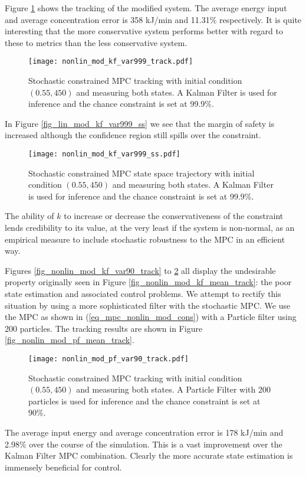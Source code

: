 Figure \ref{fig_nonlin_mod_kf_var999_track} shows the tracking of the modified system. The average energy input and average concentration error is 358 kJ/min and 11.31\% respectively. It is quite interesting that the more conservative system performs better with regard to these to metrics than the less conservative system.
\begin{figure}[H] 
\centering
\texttt{[image: nonlin\_mod\_kf\_var999\_track.pdf]}
\caption{Stochastic constrained MPC tracking with initial condition $(0.55, 450)$ and measuring both states. A Kalman Filter is used for inference and the chance constraint is set at 99.9\%.}
\label{fig_nonlin_mod_kf_var999_track}
\end{figure}
In Figure \ref{fig_lin_mod_kf_var999_ss} we see that the margin of safety is increased although the confidence region still spills over the constraint.
\begin{figure}[H] 
\centering
\texttt{[image: nonlin\_mod\_kf\_var999\_ss.pdf]}
\caption{Stochastic constrained MPC state space trajectory with initial condition $(0.55, 450)$ and measuring both states. A Kalman Filter is used for inference and the chance constraint is set at 99.9\%.}
\label{fig_nonlin_mod_kf_var999_ss}
\end{figure}
The ability of $k$ to increase or decrease the conservativeness of the constraint lends credibility to its value, at the very least if the system is non-normal, as an empirical measure to include stochastic robustness to the MPC in an efficient way.

Figures \ref{fig_nonlin_mod_kf_var90_track} to \ref{fig_nonlin_mod_kf_var999_ss} all display the undesirable property originally seen in Figure \ref{fig_nonlin_mod_kf_mean_track}: the poor state estimation and associated control problems. We attempt to rectify this situation by using a more sophisticated filter with the stochastic MPC. We use the MPC as shown in (\ref{eq_mpc_nonlin_mod_cons}) with a Particle filter using 200 particles. The tracking results are shown in Figure \ref{fig_nonlin_mod_pf_mean_track}. 
\begin{figure}[H] 
\centering
\texttt{[image: nonlin\_mod\_pf\_var90\_track.pdf]}
\caption{Stochastic constrained MPC tracking with initial condition $(0.55, 450)$ and measuring both states. A Particle Filter with 200 particles is used for inference and the chance constraint is set at 90\%.}
\label{fig_nonlin_mod_pf_var90_track}
\end{figure}
The average input energy and average concentration error is 178 kJ/min and 2.98\% over the course of the simulation. This is a vast improvement over the Kalman Filter MPC combination. Clearly the more accurate state estimation is immensely beneficial for control.

